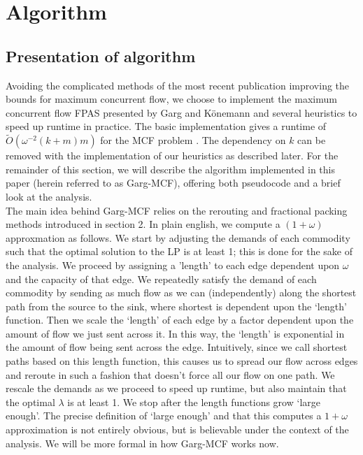 \section{Algorithm}
\subsection{Presentation of algorithm}
Avoiding the complicated methods of the most recent publication
improving the bounds for maximum concurrent flow, we choose to
implement the maximum concurrent flow FPAS presented by Garg and
K\"{o}nemann and several heuristics to speed up runtime in
practice. The basic implementation gives a runtime of
$\tilde{O}(\omega^{-2}(k+m)m)$ for the MCF problem \cite{garg}. The dependency on $k$
can be removed with
the implementation of our heuristics as described later. For the
remainder of this section, we will describe the algorithm implemented
in this paper (herein referred to as Garg-MCF), offering both
pseudocode and a brief look at the analysis. \\
The main idea behind Garg-MCF relies on the rerouting and fractional
packing methods introduced in section 2. In plain english, we compute
a $(1+\omega)$ approxmation as follows. We start by adjusting the
demands of each commodity such that the optimal solution to the LP is
at least 1; this is done for the sake of the analysis. We proceed by assigning a 'length' to each edge
dependent upon $\omega$ and
the capacity of that edge. We repeatedly satisfy the
demand of each commodity by sending as much flow as we can
(independently) along the
shortest path from the source to the sink, where shortest is dependent
upon the `length' function. Then we scale the `length' of each edge by
a factor dependent upon the amount of flow we just sent across it. In
this way, the `length' is exponential in the amount of flow being sent
across the edge. Intuitively, since we call shortest paths based on
this length function, this causes us to spread our flow across edges
and reroute in such a fashion that doesn't force all our flow on one
path. We rescale the demands as we proceed to speed up runtime, but
also maintain that the optimal $\lambda$ is at least 1. We stop after the length functions grow `large enough'. The
precise definition of `large enough' and that this computes a $1+\omega$ approximation is not
entirely obvious, but is believable under the context of the
analysis. We will be more formal in how Garg-MCF works
now.

